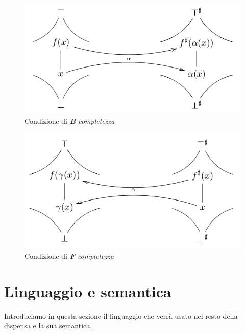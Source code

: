\documentclass[a4paper, 11pt]{report}
\begin{document}
	\begin{multicols}{2}	
		\begin{figure}[H]
			\centering
			\includegraphics[scale=0.33]{Backward}
			\caption{Condizione di \textit{\textbf{B}-completezza}}
			\label{Backward}
		\end{figure}
		\columnbreak
		\begin{figure}[H]
			\centering
			\includegraphics[scale=0.33]{Forward}
			\caption{Condizione di \textit{\textbf{F}-completezza}}
			\label{Forward}
		\end{figure}
	\end{multicols}

	\section*{Linguaggio e semantica}
	Introduciamo in questa sezione il linguaggio che verrà usato nel resto della dispensa e la sua semantica.
	
\end{document}
